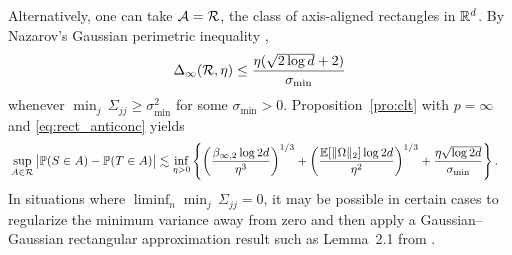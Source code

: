 Alternatively, one can take $\mathcal{A} = \mathcal{R}$,
the class of axis-aligned rectangles in $\mathbb{R}^d$.
By Nazarov's Gaussian perimetric inequality
\citep{nazarov2003maximal,chernozhukov2017central},
%
\begin{align}%
  \label{eq:rect_anticonc}
  \Delta_\infty(\cR, \eta)
  \leq \frac{\eta (\sqrt{2\log d} + 2)}{\sigma_{\min}}
\end{align}
%
whenever $\min_j \, \Sigma_{j j} \geq \sigma_{\min}^2$
for some $\sigma_{\min}>0$.
Proposition~\ref{pro:clt} with $p = \infty$
and \eqref{eq:rect_anticonc} yields
%
\begin{align*}%
  &\sup_{A\in \cR}
  \big|\P(S\in A) -\P(T\in A)\big|
  \lesssim
  \inf_{\eta > 0}
  \left\{
    \left(\frac{\beta_{\infty,2} \log 2d}{\eta^3}\right)^{1/3}
    + \left(\frac{\E[\|\Omega \|_2] \log 2d}{\eta^2}\right)^{1/3}
    + \frac{\eta \sqrt{\log 2d}}{\sigma_{\min}}
  \right\}.
\end{align*}
%
In situations where
$\liminf_n \min_j \, \Sigma_{j j} = 0$,
it may be possible in certain cases to regularize
the minimum variance away from zero and then apply
a Gaussian--Gaussian rectangular approximation result
such as Lemma~2.1 from \citet{chernozhukov2023nearly}.

